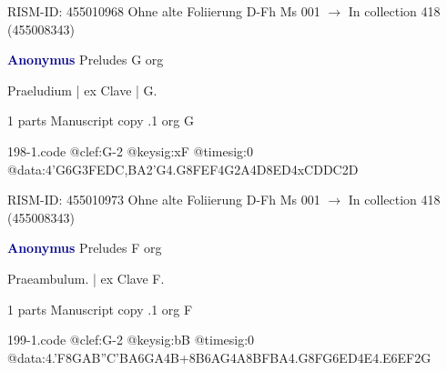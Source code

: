 \documentclass[twocolumn]{book}
\begin{document}
\newline RISM-ID: 455010968
\newline Ohne alte Foliierung
\newline D-Fh  Ms 001
\newline $\rightarrow$ In collection 418 (455008343)

\newline \par \vspace{7pt} \textcolor{darkblue}{\textbf{Anonymus  }}
\newline Preludes  G  
\newline org
\newline \begin{itshape}[f.90v, at left:] Praeludium | ex Clave | G.\end{itshape} 
\newline \textcolor{darkblue}{}  1 parts  
\newline Manuscript copy
.1  org  G  
\begin{filecontents*}{198-1.code}
@clef:G-2
@keysig:xF
@timesig:0
@data:4'G{6G3FE}{DC,BA}2'G4.G8F{EF}4G2A4D{8ED}4xCDDC2D
\end{filecontents*}
\newline
%

\newline RISM-ID: 455010973
\newline Ohne alte Foliierung
\newline D-Fh  Ms 001
\newline $\rightarrow$ In collection 418 (455008343)

\newline \par \vspace{7pt} \textcolor{darkblue}{\textbf{Anonymus  }}
\newline Preludes  F  
\newline org
\newline \begin{itshape}[f.92v, at left:] Praeambulum. | ex Clave F.\end{itshape} 
\newline \textcolor{darkblue}{}  1 parts  
\newline Manuscript copy
.1  org  F  
\begin{filecontents*}{199-1.code}
@clef:G-2
@keysig:bB
@timesig:0
@data:4.'F8G{AB''C'B}{A6GA}4B+{8B6AG}4A{8BFBA}4.G8F{G6ED}4E4.E{6EF}2G
\end{filecontents*}
\newline
%
\end{document}
